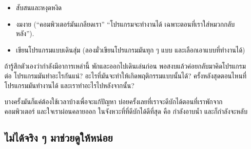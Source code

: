 \begin{itemize}

\item สับสนและหงุดหงิด

\item งมงาย (``คอมพิวเตอร์มันเกลียดเรา''
``โปรแกรมจะทำงานได้ เฉพาะตอนที่เราใส่หมวกกลับหลัง'').

\item เขียนโปรแกรมแบบเดินสุ่ม
(ลองมั่วเขียนโปรแกรมมันทุก ๆ แบบ และเลือกเอาแบบที่ทำงานได้)

\end{itemize}


ถ้ารู้สึกตัวเองว่ากำลังมีอาการเหล่านี้
พักและออกไปเดินเล่นก่อน
พอสงบแล้วค่อยกลับมาคิดโปรแกรมต่อ
โปรแกรมมันทำอะไรกันแน่?
อะไรที่มันจะทำให้เกิดพฤติกรรมแบบนั้นได้?
ครั้งหลังสุดตอนไหนที่โปรแกรมมันทำงานได้ และเราทำอะไรไปหลังจากนั้น?


บางครั้งมันก็แค่ต้องใช้เวลาบ้างเพื่อจะแก้ปัญหา
บ่อยครั้งเลยที่เราจะดีบักได้ตอนที่เราพักจากคอมพิวเตอร์ และใจเราผ่อนคลายออก
ในจังหวะที่ที่ดีบักได้ดีที่สุด
คือ กำลังอาบน้ำ และก็กำลังจะหลับ

\subsection{ไม่ได้จริง ๆ มาช่วยดูให้หน่อย}

